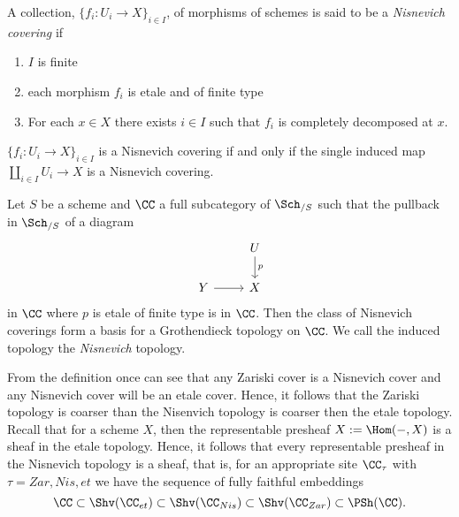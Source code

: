 \documentclass[12pt]{article}
\numberwithin{equation}{section}
\numberwithin{lemma}{section}
\numberwithin{theorem}{section}
\numberwithin{proposition}{section}
\numberwithin{corollary}{section}
\numberwithin{definition}{section}
\numberwithin{example}{section}
\numberwithin{remark}{section}
\begin{document}
\begin{definition}
  A collection, $\{f_i : U_i \to X\}_{i \in I}$, of morphisms of
  schemes is said to be a \emph{Nisnevich covering} if
  \begin{enumerate}[label=(\arabic*)]
  \item $I$ is finite
  \item each morphism $f_i$ is etale and of finite type
  \item For each $x \in X$ there exists $i \in I$ such that $f_i$ is
    completely decomposed at $x$.
  \end{enumerate}
\end{definition}

\begin{proposition}
  $\{f_i : U_i \to X\}_{i \in I}$ is a Nisnevich covering if and only if
  the single induced map $\coprod_{i \in I} U_i \to X$ is a Nisnevich
  covering.
\end{proposition}

\begin{proposition}
  Let $S$ be a scheme and $\CC$ a full subcategory of $\Sch_{/S}$
  such that the pullback in $\Sch_{/S}$ of a diagram
  \begin{equation*}
    \begin{tikzcd}
      & U \arrow[d, "p"] \\
      Y \arrow[r] & X
    \end{tikzcd}
  \end{equation*}
  in $\CC$ where $p$ is etale of finite type is in $\CC$. Then the
  class of Nisnevich coverings form a basis for a Grothendieck
  topology on $\CC$. We call the induced topology the \emph{Nisnevich}
  topology.
\end{proposition}

From the definition once can see that any Zariski cover is a Nisnevich
cover and any Nisnevich cover will be an etale cover. Hence, it
follows that the Zariski topology is coarser than the Nisenvich
topology is coarser then the etale topology. Recall that for a scheme
$X$, then the representable presheaf $X := \Hom(-, X)$ is a sheaf in
the etale topology. Hence, it follows that every representable
presheaf in the Nisnevich topology is a sheaf, that is, for an
appropriate site $\CC_\tau$ with $\tau = Zar, Nis, et$ we have the
sequence of fully faithful embeddings
\begin{equation*}
  \CC \subset \Shv(\CC_{et}) \subset \Shv(\CC_{Nis}) \subset \Shv(\CC_{Zar}) \subset \PSh(\CC).
\end{equation*}
\end{document}
